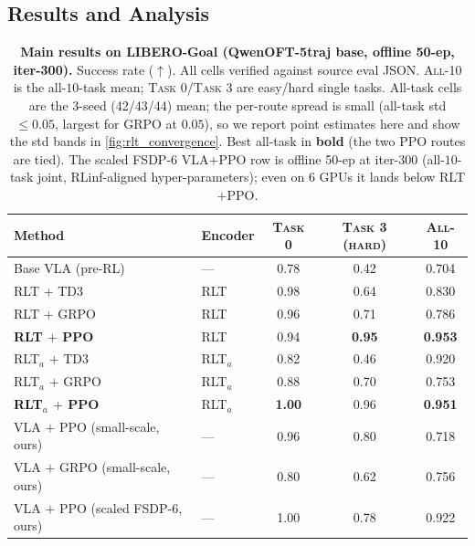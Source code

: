 \subsection{Results and Analysis}
\label{sec:rlt_results}

\begin{table}[t]
    \centering
    \caption{\textbf{Main results on LIBERO-Goal (QwenOFT-5traj base, offline 50-ep, iter-300).} Success rate ($\uparrow$). All cells verified against source eval JSON. \textsc{All-10} is the all-$10$-task mean; \textsc{Task 0}/\textsc{Task 3} are easy/hard single tasks. All-task cells are the $3$-seed (42/43/44) mean; the per-route spread is small (all-task std $\le 0.05$, largest for GRPO at $0.05$), so we report point estimates here and show the std bands in \cref{fig:rlt_convergence}. Best all-task in \textbf{bold} (the two PPO routes are tied). The scaled FSDP-$6$ VLA$+$PPO row is offline 50-ep at iter-$300$ (all-$10$-task joint, RLinf-aligned hyper-parameters); even on $6$ GPUs it lands below RLT$+$PPO.}
    \label{tab:rlt_main}
    \vspace{0.3em}
    \footnotesize
    \setlength{\tabcolsep}{6pt}
    \renewcommand{\arraystretch}{1.18}
    \begin{tabular}{@{}l l ccc@{}}
        \toprule
        \textbf{Method} & \textbf{Encoder} & \textsc{Task 0} & \textsc{Task 3 (hard)} & \textsc{All-10} \\
        \midrule
        \rowcolor{abMist} Base VLA (pre-RL) & ---     & 0.78 & 0.42 & 0.704 \\
        RLT $+$ TD3       & RLT    & 0.98 & 0.64           & 0.830 \\
        RLT $+$ GRPO      & RLT    & 0.96 & 0.71 & 0.786 \\
        \textbf{RLT $+$ PPO} & RLT & 0.94 & \textbf{0.95} & \textbf{0.953} \\
        RLT$_a$ $+$ TD3   & RLT$_a$& 0.82 & 0.46           & 0.920 \\
        RLT$_a$ $+$ GRPO  & RLT$_a$& 0.88 & 0.70           & 0.753 \\
        \textbf{RLT$_a$ $+$ PPO} & RLT$_a$ & \textbf{1.00} & 0.96 & \textbf{0.951} \\
        \midrule
        VLA $+$ PPO (small-scale, ours)  & --- & 0.96 & 0.80 & 0.718 \\
        VLA $+$ GRPO (small-scale, ours) & --- & 0.80 & 0.62 & 0.756 \\
        VLA $+$ PPO (scaled FSDP-6, ours) & --- & 1.00 & 0.78 & 0.922 \\
        \bottomrule
    \end{tabular}
\end{table}

